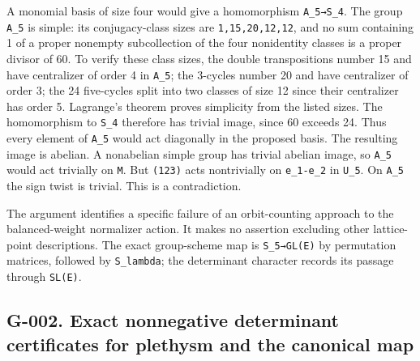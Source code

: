 \documentclass[
  10pt,
]{article}
\begin{document}
A monomial basis of size four would give a homomorphism
\texttt{\small A\_\allowbreak{}5→\allowbreak{}S\_\allowbreak{}4}. The
group \texttt{\small A\_\allowbreak{}5} is simple: its conjugacy-class
sizes are
\texttt{\small 1,\allowbreak{}15,\allowbreak{}20,\allowbreak{}12,\allowbreak{}12},
and no sum containing 1 of a proper nonempty subcollection of the four
nonidentity classes is a proper divisor of 60. To verify these class
sizes, the double transpositions number 15 and have centralizer of order
4 in \texttt{\small A\_\allowbreak{}5}; the 3-cycles number 20 and have
centralizer of order 3; the 24 five-cycles split into two classes of
size 12 since their centralizer has order 5. Lagrange's theorem proves
simplicity from the listed sizes. The homomorphism to
\texttt{\small S\_\allowbreak{}4} therefore has trivial image, since 60
exceeds 24. Thus every element of \texttt{\small A\_\allowbreak{}5}
would act diagonally in the proposed basis. The resulting image is
abelian. A nonabelian simple group has trivial abelian image, so
\texttt{\small A\_\allowbreak{}5} would act trivially on
\texttt{\small M}. But \texttt{\small (\allowbreak{}123)\allowbreak{}}
acts nontrivially on
\texttt{\small e\_\allowbreak{}1-\allowbreak{}e\_\allowbreak{}2} in
\texttt{\small U\_\allowbreak{}5}. On \texttt{\small A\_\allowbreak{}5}
the sign twist is trivial. This is a contradiction.

The argument identifies a specific failure of an orbit-counting approach
to the balanced-weight normalizer action. It makes no assertion
excluding other lattice-point descriptions. The exact group-scheme map
is
\texttt{\small S\_\allowbreak{}5→\allowbreak{}GL(\allowbreak{}E)\allowbreak{}}
by permutation matrices, followed by
\texttt{\small S\_\allowbreak{}lambda}; the determinant character
records its passage through
\texttt{\small SL(\allowbreak{}E)\allowbreak{}}.

\subsection{G-002. Exact nonnegative determinant certificates for
plethysm and the canonical
map}\label{g-002.-exact-nonnegative-determinant-certificates-for-plethysm-and-the-canonical-map}
\end{document}
